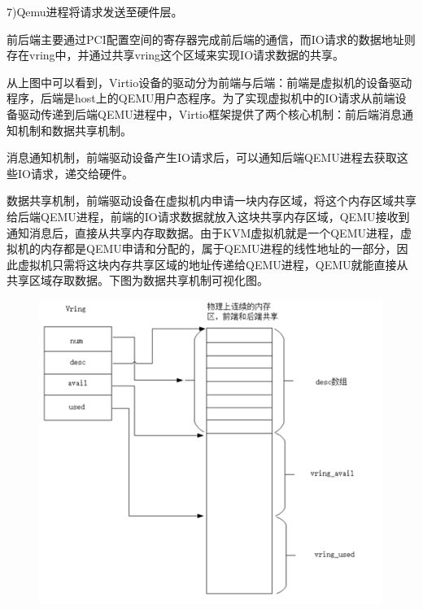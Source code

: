 7)Qemu进程将请求发送至硬件层。

前后端主要通过PCI配置空间的寄存器完成前后端的通信，而IO请求的数据地址则存在vring中，并通过共享vring这个区域来实现IO请求数据的共享。

从上图中可以看到，Virtio设备的驱动分为前端与后端：前端是虚拟机的设备驱动程序，后端是host上的QEMU用户态程序。为了实现虚拟机中的IO请求从前端设备驱动传递到后端QEMU进程中，Virtio框架提供了两个核心机制：前后端消息通知机制和数据共享机制。

消息通知机制，前端驱动设备产生IO请求后，可以通知后端QEMU进程去获取这些IO请求，递交给硬件。

数据共享机制，前端驱动设备在虚拟机内申请一块内存区域，将这个内存区域共享给后端QEMU进程，前端的IO请求数据就放入这块共享内存区域，QEMU接收到通知消息后，直接从共享内存取数据。由于KVM虚拟机就是一个QEMU进程，虚拟机的内存都是QEMU申请和分配的，属于QEMU进程的线性地址的一部分，因此虚拟机只需将这块内存共享区域的地址传递给QEMU进程，QEMU就能直接从共享区域存取数据。下图为数据共享机制可视化图。
\begin{figure}[H]
    \centering
    \includegraphics{figures/06-03-3.png}
\end{figure}